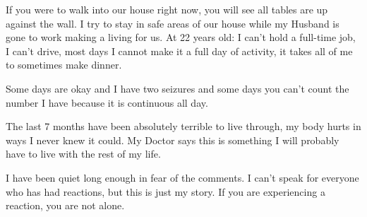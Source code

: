 {If you were to walk into our house right now, you will see all tables are up
against the wall. I try to stay in safe areas of our house while my Husband is
gone to work making a living for us. At 22 years old: I can’t hold a full-time
job, I can’t drive, most days I cannot make it a full day of activity, it takes
all of me to sometimes make dinner.

Some days are okay and I have two seizures and some days you can’t count the
number I have because it is continuous all day.

The last 7 months have been absolutely terrible to live through, my body hurts
in ways I never knew it could. My Doctor says this is something I will probably
have to live with the rest of my life.

I have been quiet long enough in fear of the comments. I can’t speak for
everyone who has had reactions, but this is just my story. If you are
experiencing a reaction, you are not alone.

}
